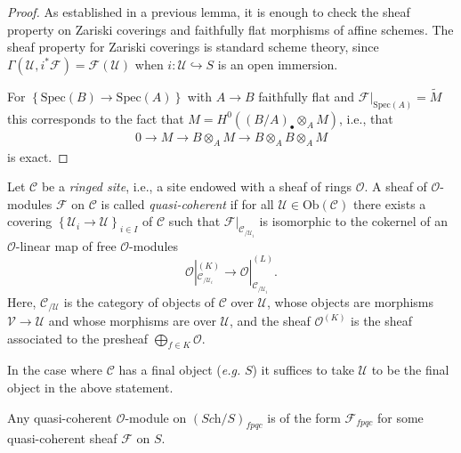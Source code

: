 \begin{proof}
As established in a previous lemma, it is enough to check the sheaf property 
on Zariski coverings and faithfully flat morphisms of affine schemes.  The 
sheaf property for Zariski coverings is standard scheme theory, since 
$\Gamma(\mathcal{U}, i^\ast \mathcal{F}) = \mathcal{F}(\mathcal{U})$ when $i: 
\mathcal{U} \hookrightarrow S$ is an open immersion. 

\medskip\noindent
For $\left\{\text{Spec}(B)\to \text{Spec}(A)\right\}$ with $A\to B$ faithfully
flat and 
$\mathcal{F}|_{\text{Spec}(A)} = \widetilde{M}$ 
this corresponds to the fact that
$M = H^0\left((B/A)_\bullet\otimes_AM \right)$, i.e., that
\begin{align*}
0 \to M \to B\otimes_A M \to B\otimes_A B \otimes_A M
\end{align*}
is exact.
\end{proof}

\begin{definition}
\label{definition-ringed-site}
Let $\mathcal{C}$ be a {\it ringed site}, i.e., a site endowed with a 
sheaf of rings $\mathcal{O}$. A sheaf of $\mathcal{O}$-modules $\mathcal{F}$ on 
$\mathcal{C}$ is called {\it quasi-coherent} if for all $\mathcal{U}\in 
\text{Ob}(\mathcal{C})$ there exists a covering $\left\{\mathcal{U}_i \to 
\mathcal{U}\right\}_{i\in I}$ of $\mathcal{C}$ such that  
$\mathcal{F}|_{\mathcal{C}_{/\mathcal{U}_i}}$ is isomorphic to the cokernel of 
an $\mathcal{O}$-linear map of free $\mathcal{O}$-modules 
$$
\mathcal{O}|_{\mathcal{C}_{/\mathcal{U}_i}}^{(K)} \to 
\mathcal{O}|_{\mathcal{C}_{/\mathcal{U}_i}}^{(L)}.
$$
Here, $\mathcal{C}_{/\mathcal{U}}$ is the category of objects of
$\mathcal{C}$ over $\mathcal{U}$, whose objects are morphisms
$\mathcal{V} \to \mathcal{U}$ and whose morphisms are over $\mathcal{U}$,
and the sheaf $\mathcal{O}^{(K)}$ is the sheaf associated to the
presheaf $\bigoplus_{f \in K} \mathcal{O}$. 
\end{definition}
  
\begin{remark}
\label{remark-final-object}
In the case where $\mathcal{C}$ has a final object ({\it e.g.} $S$) it 
suffices to take $\mathcal{U}$ to be the final object in the above statement.
\end{remark}

\begin{theorem}
\label{theorem-quasi-coherent}
Any quasi-coherent $\mathcal{O}$-module on $(\textit{Sch}/S)_{fpqc}$
is of the form $\mathcal{F}_{fpqc}$ for some quasi-coherent sheaf
$\mathcal{F}$ on $S$. 
\end{theorem}

